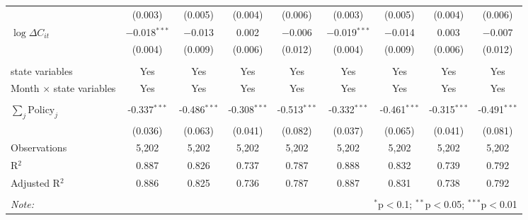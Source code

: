 \begin{tabular}{@{\extracolsep{1pt}}lcccccccc}
  & (0.003) & (0.005) & (0.004) & (0.006) & (0.003) & (0.005) & (0.004) & (0.006) \\ 
  $\log \Delta C_{it}$ & $-$0.018$^{***}$ & $-$0.013 & 0.002 & $-$0.006 & $-$0.019$^{***}$ & $-$0.014 & 0.003 & $-$0.007 \\ 
  & (0.004) & (0.009) & (0.006) & (0.012) & (0.004) & (0.009) & (0.006) & (0.012) \\ 
 \hline \\[-1.8ex] 
state variables & Yes & Yes & Yes & Yes & Yes & Yes & Yes & Yes \\ 
Month $\times$ state variables & Yes & Yes & Yes & Yes & Yes & Yes & Yes & Yes \\ 
\hline \\[-1.8ex] 
$\sum_j \mathrm{Policy}_j$ & -0.337$^{***}$ & -0.486$^{***}$ & -0.308$^{***}$ & -0.513$^{***}$ & -0.332$^{***}$ & -0.461$^{***}$ & -0.315$^{***}$ & -0.491$^{***}$ \\ 
 & (0.036) & (0.063) & (0.041) & (0.082) & (0.037) & (0.065) & (0.041) & (0.081) \\ 
Observations & 5,202 & 5,202 & 5,202 & 5,202 & 5,202 & 5,202 & 5,202 & 5,202 \\ 
R$^{2}$ & 0.887 & 0.826 & 0.737 & 0.787 & 0.888 & 0.832 & 0.739 & 0.792 \\ 
Adjusted R$^{2}$ & 0.886 & 0.825 & 0.736 & 0.787 & 0.887 & 0.831 & 0.738 & 0.792 \\ 
\hline 
\hline \\[-1.8ex] 
\textit{Note:}  & \multicolumn{8}{r}{$^{*}$p$<$0.1; $^{**}$p$<$0.05; $^{***}$p$<$0.01} \\ 
\end{tabular} 